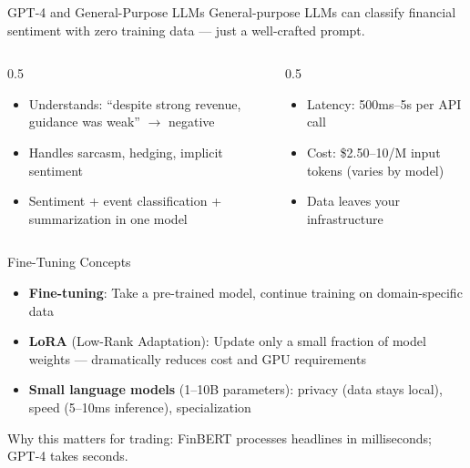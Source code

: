 \documentclass[aspectratio=169]{beamer}
\begin{document}
\begin{frame}{GPT-4 and General-Purpose LLMs}
General-purpose LLMs can classify financial sentiment \alert{with zero training data} --- just a well-crafted prompt.
\vspace{0.3cm}
\begin{columns}[T]
\begin{column}{0.5\textwidth}
\begin{shadedbox}[title=\textbf{Strengths}]
\begin{itemize}\small
  \item Understands: ``despite strong revenue, guidance was weak'' $\rightarrow$ \alert{negative}
  \item Handles sarcasm, hedging, implicit sentiment
  \item Sentiment + event classification + summarization in one model
\end{itemize}
\end{shadedbox}
\end{column}
\begin{column}{0.5\textwidth}
\begin{shadedbox}[title=\textbf{Weaknesses}]
\begin{itemize}\small
  \item Latency: 500ms--5s per API call
  \item Cost: \$2.50--10/M input tokens (varies by model)
  \item Data leaves your infrastructure
\end{itemize}
\end{shadedbox}
\end{column}
\end{columns}
\end{frame}

\begin{frame}{Fine-Tuning Concepts}
\begin{itemize}
  \item \textbf{Fine-tuning}: Take a pre-trained model, continue training on domain-specific data
  \item \textbf{LoRA} (Low-Rank Adaptation): Update only a small fraction of model weights --- dramatically reduces cost and GPU requirements
  \item \textbf{Small language models} (1--10B parameters): privacy (data stays local), speed (5--10ms inference), specialization
\end{itemize}
\vspace{0.3cm}
Why this matters for trading: \alert{FinBERT processes headlines in milliseconds; GPT-4 takes seconds.}
\end{frame}
\end{document}
